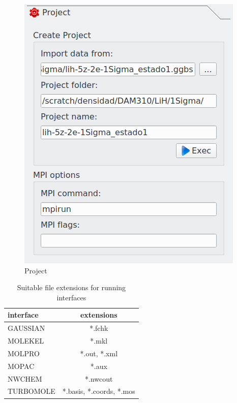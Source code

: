 \documentclass[10pt]{article}
\begin{document}
\begin{minipage}{.35\linewidth}
\vspace*{-2mm}
\begin{figure}[H]
\vspace*{-3mm}
\begin{center}
\includegraphics[width=.7\linewidth]{damqt320_project_menu.png}
\end{center}
\caption{Project \label{fig:2_1_2}}
\end{figure}
\end{minipage}
\hspace*{1cm}
\vspace*{5mm}
\begin{minipage}{.45\linewidth}
\begin{table}[H]
\begin{center}
\caption{\label{tab:2.1}Suitable file extensions for running interfaces}
\begin{tabular}{l|c}
interface & extensions \\
\hline
GAUSSIAN & *.fchk \\
MOLEKEL & *.mkl \\
MOLPRO & *.out, *.xml \\
MOPAC & *.aux \\
NWCHEM & *.nwcout \\
TURBOMOLE & *.basis, *.coords, *.mos \\
\hline
\end{tabular}
\end{center}
\end{table}
\end{minipage}
\end{document}

